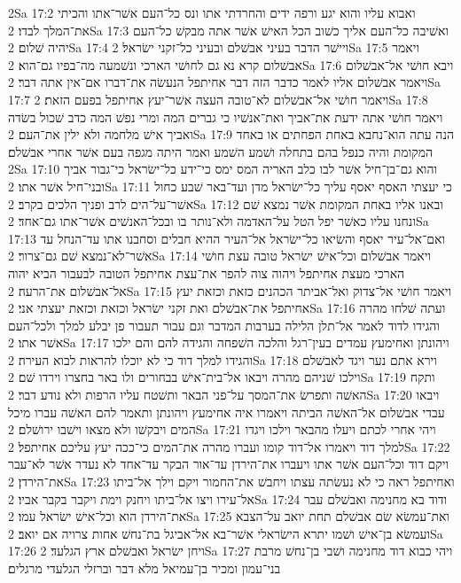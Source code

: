 2Sa 17:2  ואבוא עליו והוא יגע ורפה ידים והחרדתי אתו ונס כל־העם אשׁר־אתו והכיתי את־המלך לבדו׃
2Sa 17:3  ואשׁיבה כל־העם אליך כשׁוב הכל האישׁ אשׁר אתה מבקשׁ כל־העם יהיה שׁלום׃
2Sa 17:4  ויישׁר הדבר בעיני אבשׁלם ובעיני כל־זקני ישׂראל׃
2Sa 17:5  ויאמר אבשׁלום קרא נא גם לחושׁי הארכי ונשׁמעה מה־בפיו גם־הוא׃
2Sa 17:6  ויבא חושׁי אל־אבשׁלום ויאמר אבשׁלום אליו לאמר כדבר הזה דבר אחיתפל הנעשׂה את־דברו אם־אין אתה דבר׃
2Sa 17:7  ויאמר חושׁי אל־אבשׁלום לא־טובה העצה אשׁר־יעץ אחיתפל בפעם הזאת׃
2Sa 17:8  ויאמר חושׁי אתה ידעת את־אביך ואת־אנשׁיו כי גברים המה ומרי נפשׁ המה כדב שׁכול בשׂדה ואביך אישׁ מלחמה ולא ילין את־העם׃
2Sa 17:9  הנה עתה הוא־נחבא באחת הפחתים או באחד המקומת והיה כנפל בהם בתחלה ושׁמע השׁמע ואמר היתה מגפה בעם אשׁר אחרי אבשׁלם׃
2Sa 17:10  והוא גם־בן־חיל אשׁר לבו כלב האריה המס ימס כי־ידע כל־ישׂראל כי־גבור אביך ובני־חיל אשׁר אתו׃
2Sa 17:11  כי יעצתי האסף יאסף עליך כל־ישׂראל מדן ועד־באר שׁבע כחול אשׁר־על־הים לרב ופניך הלכים בקרב׃
2Sa 17:12  ובאנו אליו באחת המקומת אשׁר נמצא שׁם ונחנו עליו כאשׁר יפל הטל על־האדמה ולא־נותר בו ובכל־האנשׁים אשׁר־אתו גם־אחד׃
2Sa 17:13  ואם־אל־עיר יאסף והשׂיאו כל־ישׂראל אל־העיר ההיא חבלים וסחבנו אתו עד־הנחל עד אשׁר־לא־נמצא שׁם גם־צרור׃
2Sa 17:14  ויאמר אבשׁלום וכל־אישׁ ישׂראל טובה עצת חושׁי הארכי מעצת אחיתפל ויהוה צוה להפר את־עצת אחיתפל הטובה לבעבור הביא יהוה אל־אבשׁלום את־הרעה׃
2Sa 17:15  ויאמר חושׁי אל־צדוק ואל־אביתר הכהנים כזאת וכזאת יעץ אחיתפל את־אבשׁלם ואת זקני ישׂראל וכזאת וכזאת יעצתי אני׃
2Sa 17:16  ועתה שׁלחו מהרה והגידו לדוד לאמר אל־תלן הלילה בערבות המדבר וגם עבור תעבור פן יבלע למלך ולכל־העם אשׁר אתו׃
2Sa 17:17  ויהונתן ואחימעץ עמדים בעין־רגל והלכה השׁפחה והגידה להם והם ילכו והגידו למלך דוד כי לא יוכלו להראות לבוא העירה׃
2Sa 17:18  וירא אתם נער ויגד לאבשׁלם וילכו שׁניהם מהרה ויבאו אל־בית־אישׁ בבחורים ולו באר בחצרו וירדו שׁם׃
2Sa 17:19  ותקח האשׁה ותפרשׂ את־המסך על־פני הבאר ותשׁטח עליו הרפות ולא נודע דבר׃
2Sa 17:20  ויבאו עבדי אבשׁלום אל־האשׁה הביתה ויאמרו איה אחימעץ ויהונתן ותאמר להם האשׁה עברו מיכל המים ויבקשׁו ולא מצאו וישׁבו ירושׁלם׃
2Sa 17:21  ויהי אחרי לכתם ויעלו מהבאר וילכו ויגדו למלך דוד ויאמרו אל־דוד קומו ועברו מהרה את־המים כי־ככה יעץ עליכם אחיתפל׃
2Sa 17:22  ויקם דוד וכל־העם אשׁר אתו ויעברו את־הירדן עד־אור הבקר עד־אחד לא נעדר אשׁר לא־עבר את־הירדן׃
2Sa 17:23  ואחיתפל ראה כי לא נעשׂתה עצתו ויחבשׁ את־החמור ויקם וילך אל־ביתו אל־עירו ויצו אל־ביתו ויחנק וימת ויקבר בקבר אביו׃
2Sa 17:24  ודוד בא מחנימה ואבשׁלם עבר את־הירדן הוא וכל־אישׁ ישׂראל עמו׃
2Sa 17:25  ואת־עמשׂא שׂם אבשׁלם תחת יואב על־הצבא ועמשׂא בן־אישׁ ושׁמו יתרא הישׂראלי אשׁר־בא אל־אביגל בת־נחשׁ אחות צרויה אם יואב׃
2Sa 17:26  ויחן ישׂראל ואבשׁלם ארץ הגלעד׃
2Sa 17:27  ויהי כבוא דוד מחנימה ושׁבי בן־נחשׁ מרבת בני־עמון ומכיר בן־עמיאל מלא דבר וברזלי הגלעדי מרגלים׃
